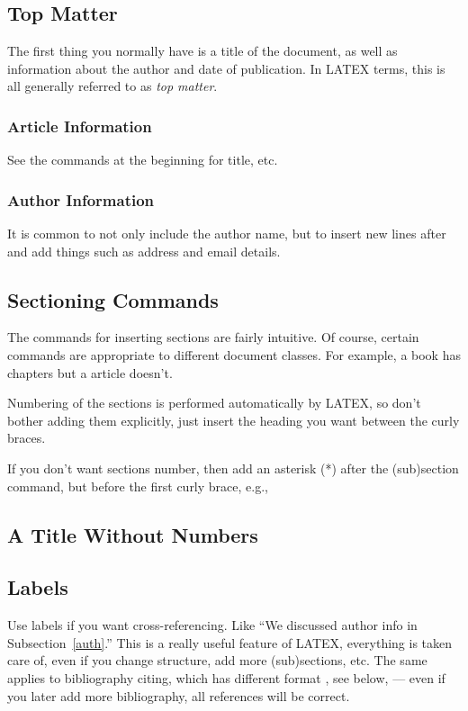 \documentclass{article}
\begin{document}
\subsection{\label{top} Top Matter}
The first thing you normally have is a title of the document, as well as
information about the author and date of publication.  In LATEX terms,
this is all generally referred to as \emph{top matter}.

\subsubsection{\label{ai} Article Information}

 See the commands at the beginning for title, etc.

\subsubsection{\label{auth} Author Information}

It is common to not only include the author name, but to insert new
lines after and add things such
as address and email details.



\subsection{\label{sect} Sectioning Commands}
The commands for inserting sections are fairly intuitive.  Of course,
certain commands are appropriate to different document classes.
For example, a book has chapters but a article doesn't.

Numbering of the sections is performed automatically by LATEX, so don't
bother adding them explicitly, just insert the heading you want between
the curly braces.

If you don't want sections number, then add an asterisk (*) after the
(sub)section command, but before the first curly brace, e.g.,

\subsection*{A Title Without Numbers}


\subsection{\label{lbls} Labels} Use labels if you want cross-referencing. Like ``We discussed author info in Subsection~\ref{auth}.''  This is a really useful feature of LATEX, everything is  taken care of, even if you change structure, add more (sub)sections, etc. The same applies to bibliography citing, which has different format \cite{lamport94}, see below, --- even if you later add more bibliography, all references will be correct.
\end{document}
